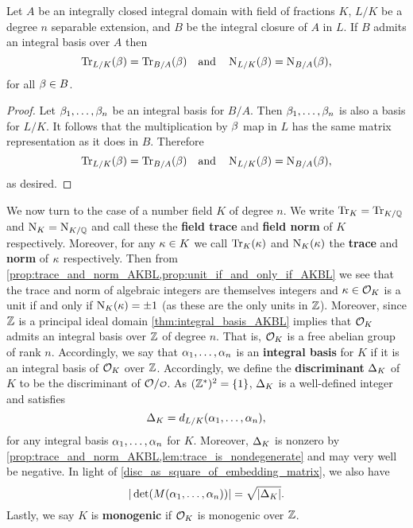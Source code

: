     \begin{proposition}\label{prop:trace_and_norm_reduce_for_integral_basis}
      Let $A$ be an integrally closed integral domain with field of fractions $K$, $L/K$ be a degree $n$ separable extension, and $B$ be the integral closure of $A$ in $L$. If $B$ admits an integral basis over $A$ then
      \[
        \operatorname{\mathrm{Tr}}_{L/K}(\beta) = \operatorname{\mathrm{Tr}}_{B/A}(\beta) \quad \text{and} \quad \operatorname{\mathrm{N}}_{L/K}(\beta) = \operatorname{\mathrm{N}}_{B/A}(\beta),
      \]
      for all $\beta \in B$.
    \end{proposition}
    \begin{proof}
      Let $\beta_{1},\ldots,\beta_{n}$ be an integral basis for $B/A$. Then $\beta_{1},\ldots,\beta_{n}$ is also a basis for $L/K$. It follows that the multiplication by $\beta$ map in $L$ has the same matrix representation as it does in $B$. Therefore
      \[
        \operatorname{\mathrm{Tr}}_{L/K}(\beta) = \operatorname{\mathrm{Tr}}_{B/A}(\beta) \quad \text{and} \quad \operatorname{\mathrm{N}}_{L/K}(\beta) = \operatorname{\mathrm{N}}_{B/A}(\beta),
      \]
      as desired.
    \end{proof}

    We now turn to the case of a number field $K$ of degree $n$. We write $\operatorname{\mathrm{Tr}}_{K} = \operatorname{\mathrm{Tr}}_{K/\mathbb{Q}}$ and $\operatorname{\mathrm{N}}_{K} = \operatorname{\mathrm{N}}_{K/\mathbb{Q}}$ and call these the \textbf{field trace} and \textbf{field norm} of $K$ respectively. Moreover, for any $\kappa \in K$ we call $\operatorname{\mathrm{Tr}}_{K}(\kappa)$ and $\operatorname{\mathrm{N}}_{K}(\kappa)$ the \textbf{trace} and \textbf{norm} of $\kappa$ respectively. Then from \cref{prop:trace_and_norm_AKBL,prop:unit_if_and_only_if_AKBL} we see that the trace and norm of algebraic integers are themselves integers and $\kappa \in \mathcal{O}_{K}$ is a unit if and only if $\operatorname{\mathrm{N}}_{K}(\kappa) = \pm 1$ (as these are the only units in $\mathbb{Z}$). Moreover, since $\mathbb{Z}$ is a principal ideal domain \cref{thm:integral_basis_AKBL} implies that $\mathcal{O}_{K}$ admits an integral basis over $\mathbb{Z}$ of degree $n$. That is, $\mathcal{O}_{K}$ is a free abelian group of rank $n$. Accordingly, we say that $\alpha_{1},\ldots,\alpha_{n}$ is an \textbf{integral basis} for $K$ if it is an integral basis of $\mathcal{O}_{K}$ over $\mathbb{Z}$. Accordingly, we define the \textbf{discriminant} $\Delta_{K}$ of $K$ to be the discriminant of $\mc{O}/\smc{O}$. As $(\mathbb{Z}^{\ast})^{2} = \{1\}$, $\Delta_{K}$ is a well-defined integer and satisfies
    \[
      \Delta_{K} = d_{L/K}(\alpha_{1},\ldots,\alpha_{n}),
    \]
    for any integral basis $\alpha_{1},\ldots,\alpha_{n}$ for $K$. Moreover, $\Delta_{K}$ is nonzero by \cref{prop:trace_and_norm_AKBL,lem:trace_is_nondegenerate} and may very well be negative. In light of \cref{disc_as_square_of_embedding_matrix}, we also have
    \[
      |\det(M(\alpha_{1},\ldots,\alpha_{n}))| = \sqrt{|\Delta_{K}|}.
    \]
    Lastly, we say $K$ is \textbf{monogenic} if $\mathcal{O}_{K}$ is monogenic over $\mathbb{Z}$.
